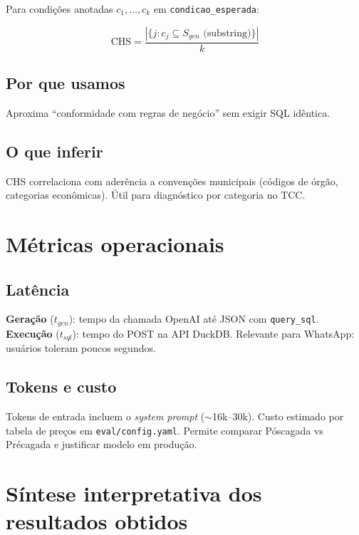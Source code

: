 Para condições anotadas $c_1,\ldots,c_k$ em \texttt{condicao\_esperada}:

\[
\text{CHS} = \frac{|\{ j : c_j \subseteq S_{gen} \text{ (substring)} \}|}{k}
\]

\subsection{Por que usamos}

Aproxima ``conformidade com regras de negócio'' sem exigir SQL idêntica.

\subsection{O que inferir}

CHS correlaciona com aderência a convenções municipais (códigos de órgão, categorias econômicas). Útil para diagnóstico por categoria no TCC.

\section{Métricas operacionais}

\subsection{Latência}

\textbf{Geração} ($t_{gen}$): tempo da chamada OpenAI até JSON com \texttt{query\_sql}. \textbf{Execução} ($t_{sql}$): tempo do POST na API DuckDB. Relevante para WhatsApp: usuários toleram poucos segundos.

\subsection{Tokens e custo}

Tokens de entrada incluem o \textit{system prompt} ($\sim$16k--30k). Custo estimado por tabela de preços em \texttt{eval/config.yaml}. Permite comparar Póscagada vs Précagada e justificar modelo em produção.

\section{Síntese interpretativa dos resultados obtidos}

